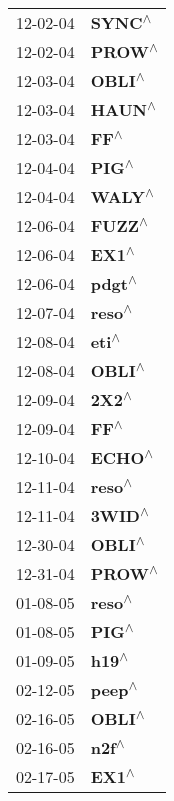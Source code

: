 \begin{supertabular}{p{0.08\textwidth}p{0.2\textwidth}}
 12-02-04 &    \textbf{SYNC\textsuperscript{$\wedge$}} \\
 12-02-04 &    \textbf{PROW\textsuperscript{$\wedge$}} \\
 12-03-04 &    \textbf{OBLI\textsuperscript{$\wedge$}} \\
 12-03-04 &    \textbf{HAUN\textsuperscript{$\wedge$}} \\
 12-03-04 &      \textbf{FF\textsuperscript{$\wedge$}} \\
 12-04-04 &     \textbf{PIG\textsuperscript{$\wedge$}} \\
 12-04-04 &    \textbf{WALY\textsuperscript{$\wedge$}} \\
 12-06-04 &    \textbf{FUZZ\textsuperscript{$\wedge$}} \\
 12-06-04 &     \textbf{EX1\textsuperscript{$\wedge$}} \\
 12-06-04 &    \textbf{pdgt\textsuperscript{$\wedge$}} \\
 12-07-04 &    \textbf{reso\textsuperscript{$\wedge$}} \\
 12-08-04 &     \textbf{eti\textsuperscript{$\wedge$}} \\
 12-08-04 &    \textbf{OBLI\textsuperscript{$\wedge$}} \\
 12-09-04 &     \textbf{2X2\textsuperscript{$\wedge$}} \\
 12-09-04 &      \textbf{FF\textsuperscript{$\wedge$}} \\
 12-10-04 &    \textbf{ECHO\textsuperscript{$\wedge$}} \\
 12-11-04 &    \textbf{reso\textsuperscript{$\wedge$}} \\
 12-11-04 &    \textbf{3WID\textsuperscript{$\wedge$}} \\
 12-30-04 &    \textbf{OBLI\textsuperscript{$\wedge$}} \\
 12-31-04 &    \textbf{PROW\textsuperscript{$\wedge$}} \\
 01-08-05 &    \textbf{reso\textsuperscript{$\wedge$}} \\
 01-08-05 &     \textbf{PIG\textsuperscript{$\wedge$}} \\
 01-09-05 &     \textbf{h19\textsuperscript{$\wedge$}} \\
 02-12-05 &    \textbf{peep\textsuperscript{$\wedge$}} \\
 02-16-05 &    \textbf{OBLI\textsuperscript{$\wedge$}} \\
 02-16-05 &     \textbf{n2f\textsuperscript{$\wedge$}} \\
 02-17-05 &     \textbf{EX1\textsuperscript{$\wedge$}} \\

\end{supertabular}
